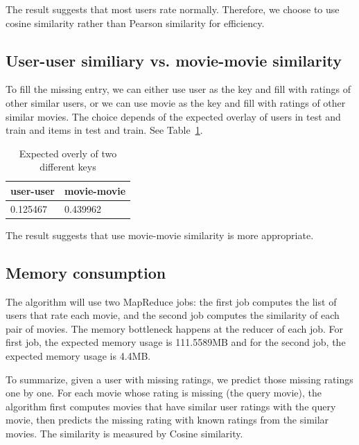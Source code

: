 The result suggests that most users rate normally. Therefore, we
choose to use cosine similarity rather than Pearson similarity for
efficiency.

\subsection*{User-user similiary vs. movie-movie similarity}
To fill the missing entry, we can either use user as the key and fill with
ratings of other similar users, or we can use movie as the key and
fill with ratings of other similar movies. The choice depends of the
expected overlay of users in test and train and items in test and
train. See Table~\ref{tab:overlay}.

\begin{table}[!ht]
  \centering
  \begin{tabular}{|p{5cm}|p{5cm}|}
    \hline
    user-user & movie-movie\\
    \hline
    0.125467 & 0.439962\\
    \hline
  \end{tabular}
  \caption{Expected overly of two different keys}
  \label{tab:overlay}
\end{table}

The result suggests that use movie-movie similarity is more
appropriate.

\subsection*{Memory consumption}
The algorithm will use two MapReduce jobs: the first job computes
the list of users that rate each movie, and the second job computes
the similarity of each pair of movies. The memory bottleneck happens
at the reducer of each job. For first job, the expected memory usage
is 111.5589MB and for the second job, the expected memory usage is 4.4MB.

To summarize, given a user with missing ratings, we predict those
missing ratings one by one. For each movie whose rating is missing
(the query movie), the algorithm first computes movies that have
similar user ratings with the query movie, then predicts the missing
rating with known ratings from the similar movies. The similarity is
measured by Cosine similarity.
